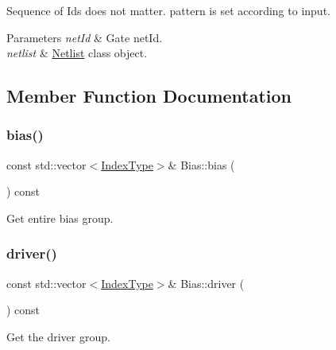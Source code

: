 Sequence of Ids does not matter. pattern is set according to input.


\begin{DoxyParams}{Parameters}
{\em net\+Id} & Gate net\+Id. \\
\hline
{\em netlist} & \hyperlink{classNetlist}{Netlist} class object. \\
\hline
\end{DoxyParams}


\subsection{Member Function Documentation}
\mbox{\label{classBias_ae8bea9924068867c86a28fa01fe015dc}} 
\subsubsection{\texorpdfstring{bias()}{bias()}}
{\footnotesize\ttfamily const std\+::vector$<$\hyperlink{type_8h_a581e8093e28e7362f2b6937296190676}{Index\+Type}$>$\& Bias\+::bias (\begin{DoxyParamCaption}{ }\end{DoxyParamCaption}) const\hspace{0.3cm}{\ttfamily [inline]}}



Get entire bias group. 

\mbox{\label{classBias_a1ce69bcc1c78a3a06ba13a3bcb363fb5}} 
\subsubsection{\texorpdfstring{driver()}{driver()}}
{\footnotesize\ttfamily const std\+::vector$<$\hyperlink{type_8h_a581e8093e28e7362f2b6937296190676}{Index\+Type}$>$\& Bias\+::driver (\begin{DoxyParamCaption}{ }\end{DoxyParamCaption}) const\hspace{0.3cm}{\ttfamily [inline]}}



Get the driver group. 

\mbox{\label{classBias_ab2453141710ffdb4644d6427c3edd34d}} 
